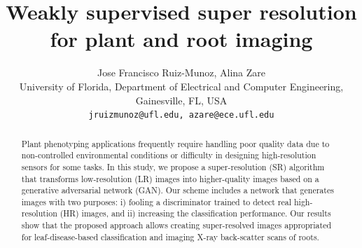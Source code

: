 \documentclass[10pt,twocolumn,letterpaper]{article}
\begin{document}
\title{Weakly supervised super resolution for plant and root imaging}

\author{Jose Francisco Ruiz-Munoz, Alina Zare \\
University of Florida, Department of Electrical and Computer Engineering, Gainesville, FL, USA\\
{\tt\small jruizmunoz@ufl.edu, azare@ece.ufl.edu}
}

\maketitle

\begin{abstract}
   Plant phenotyping applications frequently require handling poor quality data due to non-controlled environmental conditions or difficulty in designing high-resolution sensors for some tasks. In this study, we propose a super-resolution (SR) algorithm that transforms low-resolution (LR) images into higher-quality images based on a generative adversarial network (GAN). Our scheme includes a network that generates images with two purposes: i) fooling a discriminator trained to detect real high-resolution (HR) images, and ii) increasing the classification performance. Our results show that the proposed approach allows creating super-resolved images appropriated for leaf-disease-based classification and imaging X-ray back-scatter scans of roots.
\end{abstract}

\end{document}
